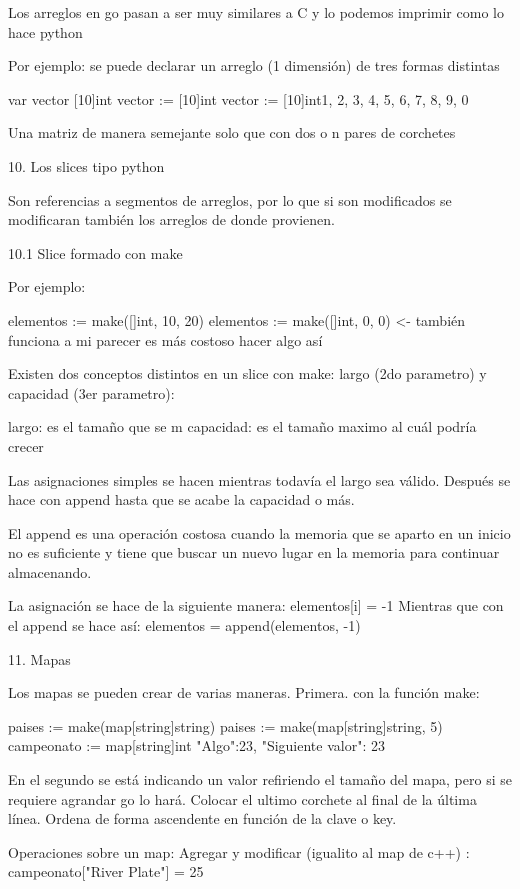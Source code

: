 Los arreglos en go pasan a ser muy similares a C y lo podemos imprimir como lo hace python

Por ejemplo: se puede declarar un arreglo (1 dimensión) de tres formas distintas

    var vector [10]int
    vector := [10]int 
    vector := [10]int{1, 2, 3, 4, 5, 6, 7, 8, 9, 0}

Una matriz de manera semejante solo que con dos o n pares de corchetes

10. Los slices tipo python

Son referencias a segmentos de arreglos, por lo que si son modificados se modificaran también los arreglos de donde provienen.

10.1 Slice formado con make

Por ejemplo: 

    elementos := make([]int, 10, 20)
    elementos := make([]int, 0, 0) <- también funciona a mi parecer es más costoso hacer algo así

Existen dos conceptos distintos en un slice con make: largo (2do parametro) y capacidad (3er parametro):

largo: es el tamaño que se m
capacidad: es el tamaño maximo al cuál podría crecer

Las asignaciones simples se hacen mientras todavía el largo sea válido.
Después se hace con append hasta que se acabe la capacidad o más.

El append es una operación costosa cuando la memoria que se aparto en un inicio 
no es suficiente y tiene que buscar un nuevo lugar en la memoria para continuar 
almacenando.

La asignación se hace de la siguiente manera: elementos[i] = -1
Mientras que con el append se hace así: elementos = append(elementos, -1)

11. Mapas

Los mapas se pueden crear de varias maneras.
Primera. con la función make:

    paises := make(map[string]string)
    paises := make(map[string]string, 5)
    campeonato := map[string]int{
        "Algo":23,
        "Siguiente valor": 23}
    
En el segundo se está indicando un valor refiriendo el tamaño del mapa, pero si se requiere agrandar go lo hará.
Colocar el ultimo corchete al final de la última línea.
Ordena de forma ascendente en función de la clave o key.

Operaciones sobre un map:
Agregar y modificar (igualito al map de c++) : 
    campeonato["River Plate"] = 25

